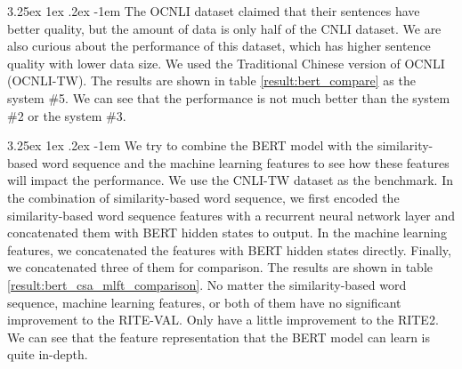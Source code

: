 \documentclass[12pt]{article}
\makeatletter
\renewcommand\paragraph{\@startsection{paragraph}{5}{\z@}%
  {3.25ex \@plus1ex \@minus.2ex}%
  {-1em}%
  {\normalfont\normalsize\bfseries}}
\makeatother
\begin{document}
\begin{CJK*}{UTF8}{bkai}
\begin{spacing}{1.77}
\paragraph{}
The OCNLI dataset claimed that their sentences have better quality, but the amount of data is only half of the CNLI dataset. We are also curious about the performance of this dataset, which has higher sentence quality with lower data size. We used the Traditional Chinese version of OCNLI (OCNLI-TW). The results are shown in table \ref{result:bert_compare} as the system \#5. We can see that the performance is not much better than the system \#2 or the system \#3.

\paragraph{}
We try to combine the BERT model with the similarity-based word sequence and the machine learning features to see how these features will impact the performance. We use the CNLI-TW dataset as the benchmark. In the combination of similarity-based word sequence, we first encoded the similarity-based word sequence features with a recurrent neural network layer and concatenated them with BERT hidden states to output. In the machine learning features, we concatenated the features with BERT hidden states directly. Finally, we concatenated three of them for comparison. The results are shown in table \ref{result:bert_csa_mlft_comparison}. No matter the similarity-based word sequence, machine learning features, or both of them have no significant improvement to the RITE-VAL. Only have a little improvement to the RITE2. We can see that the feature representation that the BERT model can learn is quite in-depth.


\end{spacing}
\end{CJK*}
\end{document}
